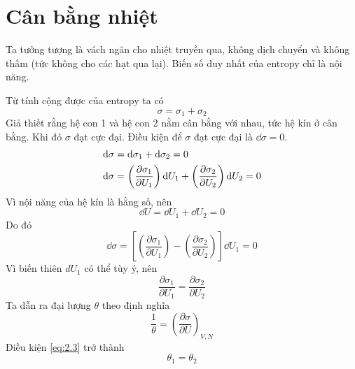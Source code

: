 \section{Cân bằng nhiệt}
	Ta tưởng tượng là vách ngăn cho nhiệt truyền qua, không dịch chuyển và không thấm (tức không cho các hạt qua lại). Biến số duy nhất của entropy chỉ là nội năng.
	
	Từ tính cộng được của entropy ta có
	\begin{equation*}
		\sigma = \sigma_1 + \sigma_2
	\end{equation*}
	Giả thiết rằng hệ con 1 và hệ con 2 nằm cân bằng với nhau, tức hệ kín ở cân bằng. Khi đó $ \sigma $ đạt cực đại. Điều kiện để $ \sigma $ đạt cực đại là $ \dd{\sigma} = 0 $.
	\begin{align}
		\mathrm{d}\sigma & = \mathrm{d}\sigma_1 + \mathrm{d}\sigma_2 = 0 \notag \\
		\mathrm{d}\sigma & = \left(\dfrac{\partial \sigma_1}{\partial U_1}\right) \mathrm{d}U_1 + \left(\dfrac{\partial \sigma_2}{\partial U_2}\right) \mathrm{d}U_2 = 0
	\end{align}
	Vì nội năng của hệ kín là hằng số, nên
	\begin{equation*}
		\dd{U} = \dd{U_1} + \dd{U_2} = 0
	\end{equation*}
	Do đó
	\begin{equation*}
		\dd{\sigma} = \left[\left(\dfrac{\partial \sigma_1}{\partial U_1}\right) - \left(\dfrac{\partial \sigma_2}{\partial U_2}\right)\right] \dd{U_1} = 0
	\end{equation*}
	Vì biến thiên $ dU_1 $ có thể tùy ý, nên
	\begin{equation}\label{eq:2.3}
		\dfrac{\partial \sigma_1}{\partial U_1} = \dfrac{\partial \sigma_2}{\partial U_2}
	\end{equation}
	Ta dẫn ra đại lượng $ \theta $ theo định nghĩa
	\begin{equation}\label{eq:2.4}
		\dfrac{1}{\theta} = \left(\dfrac{\partial \sigma}{\partial U}\right)_{V, N}
	\end{equation}
	Điều kiện \eqref{eq:2.3} trở thành
	\begin{equation}\label{eq:2.5}
		\theta_1 = \theta_2
	\end{equation}